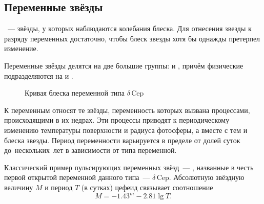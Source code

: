 \subsection{Переменные звёзды}
~--- звёзды, у которых наблюдаются колебания блеска.   Для отнесения звезды к разряду переменных достаточно, чтобы блеск звезды хотя бы однажды претерпел изменение.

Переменные звёзды делятся на две большие группы:  и , причём физические подразделяются на  и .

\begin{wrapfigure}[11]{l}{0.47\tw}
	\centering
	\vspace{-1.2pc}
	\caption{Кривая блеска переменной типа $\delta$\,Cep}
	\label{pic:d-cep}
\end{wrapfigure}
К  переменным  относят те звёзды, переменность которых вызвана процессами, происходящими в их недрах. Эти процессы приводят к периодическому изменению температуры поверхности и радиуса фотосферы, а вместе с тем и блеска звезды. Период переменности варьируется в пределе от долей суток до~нескольких~лет в зависимости от типа переменной.

Классический пример пульсирующих переменных звёзд~--- , названные в честь первой открытой переменной данного типа~--- $\delta$\,Cep. Абсолютную звёздную величину $M$ и период $T$ (в сутках) цефеид связывает соотношение
\begin{equation}
	M = -1.43^m - 2.81\lg T.
\end{equation}

